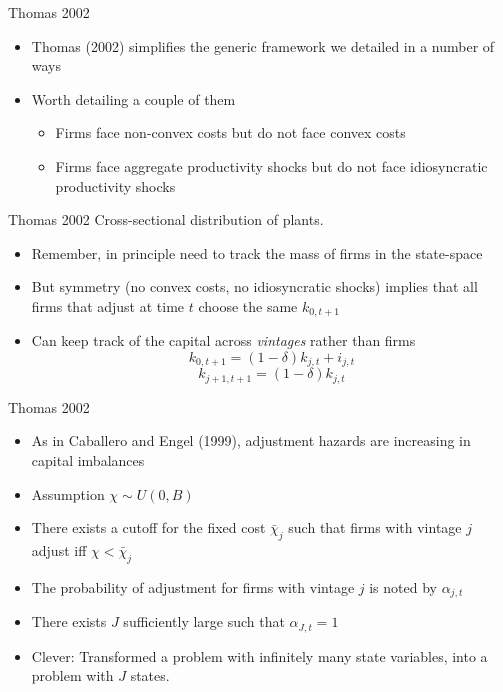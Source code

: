 \documentclass[11pt,aspectratio=169,xcolor={dvipsnames},hyperref={pdftex,pdfpagemode=UseNone,hidelinks,pdfdisplaydoctitle=true},usepdftitle=false]{beamer}
\begin{document}
\begin{frame}{Thomas 2002}
\begin{itemize}
\item Thomas (2002) simplifies the generic framework we detailed in a number of ways
\item Worth detailing a couple of them
\begin{itemize}
\item Firms face non-convex costs but do not face convex costs
\item Firms face aggregate productivity shocks but do not face idiosyncratic productivity shocks
\end{itemize}
\end{itemize}
\end{frame}

\begin{frame}{Thomas 2002}
Cross-sectional distribution of plants.
\begin{itemize}
\item Remember, in principle need to track the mass of firms in the state-space
\item But symmetry (no convex costs, no idiosyncratic shocks) implies that all firms that adjust at time $t$ choose the same $k_{0,t+1}$
\item Can keep track of the capital across \textit{vintages} rather than firms
$$k_{0,t+1} = (1-\delta)k_{j,t} + i_{j,t}$$
$$k_{j+1,t+1} = (1-\delta) k_{j,t}$$
\end{itemize}
\end{frame}


\begin{frame}{Thomas 2002}
\begin{itemize}
\item As in Caballero and Engel (1999), adjustment hazards are increasing in capital imbalances
\item Assumption $\chi \sim U(0,B)$
\item There exists a cutoff for the fixed cost $\bar{\chi}_j$ such that firms with vintage $j$ adjust iff $\chi < \bar{\chi}_j$
\item The probability of adjustment for firms with vintage $j$ is noted by $\alpha_{j,t}$	
\item There exists $J$ sufficiently large such that $\alpha_{J,t} = 1$
\item Clever: Transformed a problem with infinitely many state variables, into a problem with $J$ states.
\end{itemize}
\end{frame}
\end{document}
